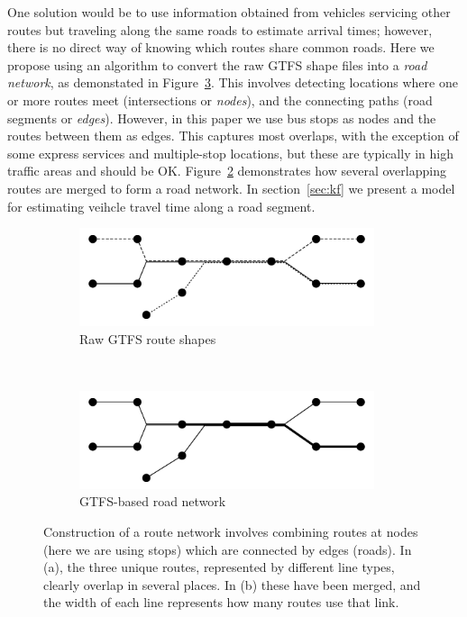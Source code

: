 One solution would be to use information obtained from
vehicles servicing other routes but traveling along the same roads
to estimate arrival times;
however, there is no direct way of knowing which routes share common roads.
Here we propose using an algorithm to convert the raw GTFS shape files
into a \emph{road network},
as demonstated in Figure~\ref{fig:network_creation}.
This involves detecting locations where one or more routes meet 
(intersections or \emph{nodes}),
and the connecting paths (road segments or \emph{edges}).
However, in this paper we use bus stops as nodes and the routes between them as edges.
This captures most overlaps, 
with the exception of some express services and multiple-stop locations,
but these are typically in high traffic areas and should be OK.
Figure~\ref{fig:network_creation_2} demonstrates how several overlapping routes 
are merged to form a road network.
In section~\ref{sec:kf} we present a model for estimating veihcle travel time
along a road segment.

\begin{figure}[tb]
    \centering
    \begin{subfigure}{0.7\textwidth}
        \centering
        \includegraphics[width=0.95\textwidth]{figures/02_network_segments_1.pdf}
        \caption{Raw GTFS route shapes}
        \label{fig:network_creation_1}
    \end{subfigure} \\
    \begin{subfigure}{0.7\textwidth}
        \centering
        \includegraphics[width=0.95\textwidth]{figures/02_network_segments_2.pdf}
        \caption{GTFS-based road network}
        \label{fig:network_creation_2}
    \end{subfigure}
    \caption{Construction of a route network involves combining routes at nodes %
        (here we are using stops) which are connected by edges (roads). %
        In (a), the three unique routes, represented by different line types, clearly %
        overlap in several places. In (b) these have been merged, and the width of each line %
        represents how many routes use that link.}
    \label{fig:network_creation}
\end{figure}



